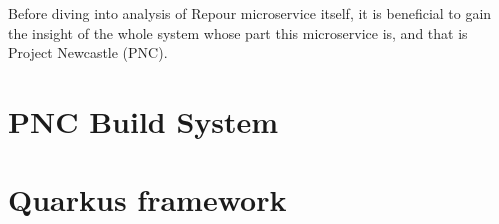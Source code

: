 \documentclass[../../main.tex]{subfiles}
\begin{document}
Before diving into analysis of Repour microservice itself, it is beneficial to gain the insight of the whole system whose part this microservice is, and that is Project Newcastle (PNC).

\section{PNC Build System}


\section{Quarkus framework}

\end{document}
